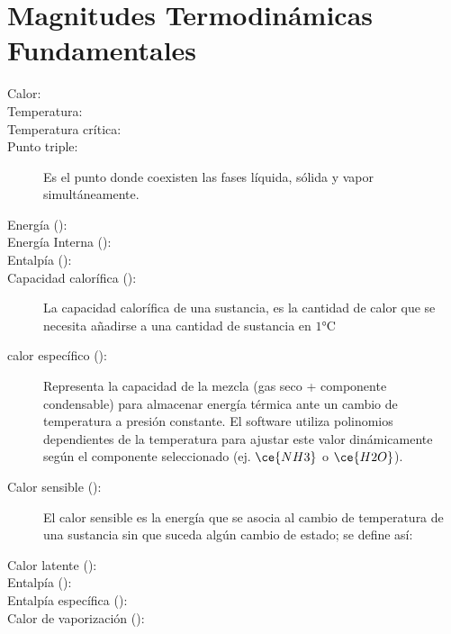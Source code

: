 \section{Magnitudes Termodinámicas Fundamentales}
    \begin{description}
        \item[Calor:] 
        \item[Temperatura:] 
        \item[Temperatura crítica:] 
        \item[Punto triple:] Es el punto donde coexisten las fases líquida, sólida y vapor simultáneamente. 
        \item[Energía (${}$):]
        \item[Energía Interna (${}$):]
        \item[Entalpía (${}$):]
        \item[Capacidad calorífica (${}$):] La capacidad calorífica de una sustancia, es la cantidad de calor que se necesita añadirse a una cantidad de sustancia en $1 \unit{\celsius}$ 
        \item[calor específico (${}$):] Representa la capacidad de la mezcla (gas seco + componente condensable) para almacenar energía térmica ante un cambio de temperatura a presión constante. El software utiliza polinomios dependientes de la temperatura para ajustar este valor dinámicamente según el componente seleccionado (ej. $\ce{NH3}$ o $\ce{H2O}$).
        \item[Calor sensible (${}$):] El calor sensible es la energía que se asocia al cambio de temperatura de una sustancia sin que suceda algún cambio de estado; se define así:
        \item[Calor latente (${}$):]
        \item[Entalpía (${}$):] 
        \item[Entalpía específica (${}$):] 
        \item[Calor de vaporización (${}$):] 
    \end{description}


    
